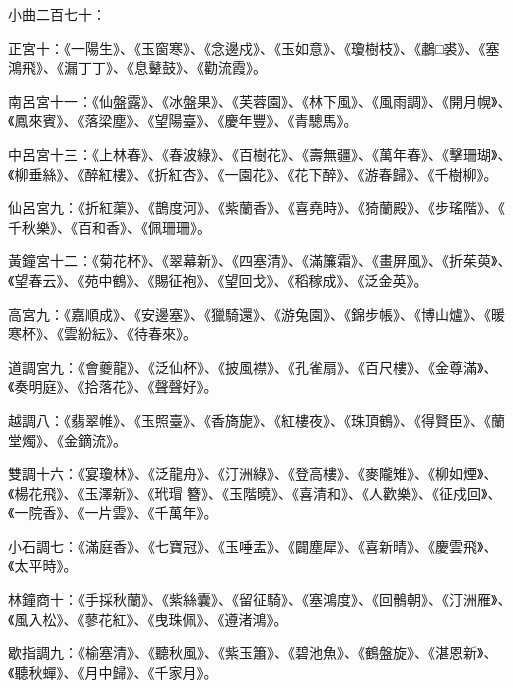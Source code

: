 \begin{pinyinscope}
 小曲二百七十：



 正宮十：《一陽生》、《玉窗寒》、《念邊戍》、《玉如意》、《瓊樹枝》、《鷫□裘》、《塞鴻飛》、《漏丁丁》、《息鼙鼓》、《勸流霞》。



 南呂宮十一：《仙盤露》、《冰盤果》、《芙蓉園》、《林下風》、《風雨調》、《開月幌》、《鳳來賓》、《落梁塵》、《望陽臺》、《慶年豐》、《青驄馬》。



 中呂宮十三：《上林春》、《春波綠》、《百樹花》、《壽無疆》、《萬年春》、《擊珊瑚》、《柳垂絲》、《醉紅樓》、《折紅杏》、《一園花》、《花下醉》、《游春歸》、《千樹柳》。



 仙呂宮九：《折紅蕖》、《鵲度河》、《紫蘭香》、《喜堯時》、《猗蘭殿》、《步瑤階》、《
 千秋樂》、《百和香》、《佩珊珊》。



 黃鐘宮十二：《菊花杯》、《翠幕新》、《四塞清》、《滿簾霜》、《畫屏風》、《折茱萸》、《望春云》、《苑中鶴》、《賜征袍》、《望回戈》、《稻稼成》、《泛金英》。



 高宮九：《嘉順成》、《安邊塞》、《獵騎還》、《游兔園》、《錦步帳》、《博山爐》、《暖寒杯》、《雲紛紜》、《待春來》。



 道調宮九：《會夔龍》、《泛仙杯》、《披風襟》、《孔雀扇》、《百尺樓》、《金尊滿》、《奏明庭》、《拾落花》、《聲聲好》。



 越調八：《翡翠帷》、《玉照臺》、《香旖旎》、《紅樓夜》、《珠頂鶴》、《得賢臣》、《蘭堂燭》、《金鏑流》。



 雙調十六：《宴瓊林》、《泛龍舟》、《汀洲綠》、《登高樓》、《麥隴雉》、《柳如煙》、《楊花飛》、《玉澤新》、《玳瑁
 簪》、《玉階曉》、《喜清和》、《人歡樂》、《征戍回》、《一院香》、《一片雲》、《千萬年》。



 小石調七：《滿庭香》、《七寶冠》、《玉唾盂》、《闢塵犀》、《喜新晴》、《慶雲飛》、《太平時》。



 林鐘商十：《手採秋蘭》、《紫絲囊》、《留征騎》、《塞鴻度》、《回鶻朝》、《汀洲雁》、《風入松》、《蓼花紅》、《曳珠佩》、《遵渚鴻》。



 歇指調九：《榆塞清》、《聽秋風》、《紫玉簫》、《碧池魚》、《鶴盤旋》、《湛恩新》、《聽秋蟬》、《月中歸》、《千家月》。




\end{pinyinscope}
